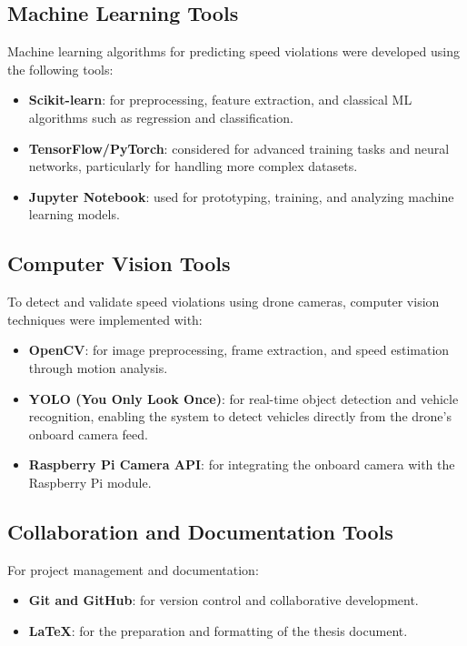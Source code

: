 \subsection*{Machine Learning Tools}
Machine learning algorithms for predicting speed violations were developed 
using the following tools:  
\begin{itemize}
    \item \textbf{Scikit-learn}: for preprocessing, feature extraction, and classical ML algorithms 
    such as regression and classification.  
    \item \textbf{TensorFlow/PyTorch}: considered for advanced training tasks and 
    neural networks, particularly for handling more complex datasets.  
    \item \textbf{Jupyter Notebook}: used for prototyping, training, and analyzing 
    machine learning models.  
\end{itemize}

\subsection*{Computer Vision Tools}
To detect and validate speed violations using drone cameras, computer vision 
techniques were implemented with:  
\begin{itemize}
    \item \textbf{OpenCV}: for image preprocessing, frame extraction, and speed estimation 
    through motion analysis.  
    \item \textbf{YOLO (You Only Look Once)}: for real-time object detection and vehicle recognition, 
    enabling the system to detect vehicles directly from the drone’s onboard camera feed.  
    \item \textbf{Raspberry Pi Camera API}: for integrating the onboard camera with the 
    Raspberry Pi module.  
\end{itemize}

\subsection*{Collaboration and Documentation Tools}
For project management and documentation:  
\begin{itemize}
    \item \textbf{Git and GitHub}: for version control and collaborative development.  
    \item \textbf{LaTeX}: for the preparation and formatting of the thesis document.  
\end{itemize}


